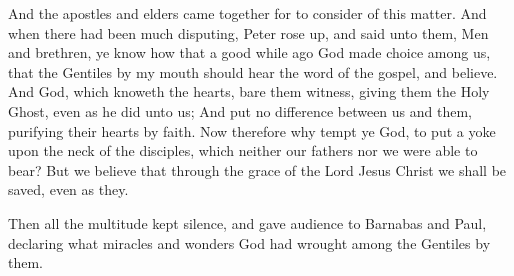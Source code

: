  And the apostles and elders came together for to consider
of this matter.  And when there had been much disputing,
Peter rose up, and said unto them, Men and brethren, ye know how that a
good while ago God made choice among us, that the Gentiles by my mouth
should hear the word of the gospel, and believe.  And God,
which knoweth the hearts, bare them witness, giving them the Holy Ghost,
even as he did unto us;  And put no difference between us
and them, purifying their hearts by faith.  Now therefore
why tempt ye God, to put a yoke upon the neck of the disciples, which
neither our fathers nor we were able to bear?  But we
believe that through the grace of the Lord Jesus Christ we shall be
saved, even as they.

 Then all the multitude kept silence, and gave audience
to Barnabas and Paul, declaring what miracles and wonders God had
wrought among the Gentiles by them.

